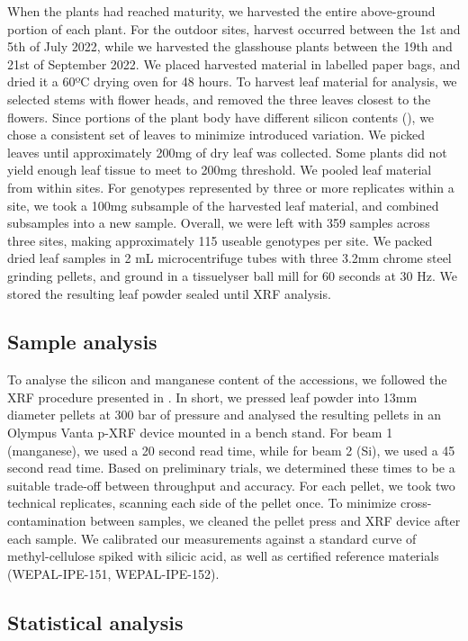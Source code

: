 \documentclass[12pt, letterpaper, ]{report}
\begin{document}
When the plants had reached maturity, we harvested the entire above-ground portion of each plant. For the outdoor sites, harvest occurred between the 1st and 5th of July 2022, while we harvested the glasshouse plants between the 19th and 21st of September 2022. We placed harvested material in labelled paper bags, and dried it a 60ºC drying oven for 48 hours. To harvest leaf material for analysis, we selected stems with flower heads, and removed the three leaves closest to the flowers. Since portions of the plant body have different silicon contents (\cite{dai_genetic_2005}), we chose a consistent set of leaves to minimize introduced variation. We picked leaves until approximately 200mg of dry leaf was collected. Some plants did not yield enough leaf tissue to meet to 200mg threshold. We pooled leaf material from within sites. For genotypes represented by three or more replicates within a site, we took a 100mg subsample of the harvested leaf material, and combined subsamples into a new sample. Overall, we were left with 359 samples across three sites, making approximately 115 useable genotypes per site. We packed dried leaf samples in 2 mL microcentrifuge tubes with three 3.2mm chrome steel grinding pellets, and ground in a tissuelyser ball mill for 60 seconds at 30 Hz. We stored the resulting leaf powder sealed until XRF analysis.  

\subsection{Sample analysis}

To analyse the silicon and manganese content of the accessions, we followed the XRF procedure presented in \textcite{reidinger_rapid_2012}. In short, we pressed leaf powder into 13mm diameter pellets at 300 bar of pressure and analysed the resulting pellets in an Olympus Vanta p-XRF device mounted in a bench stand. For beam 1 (manganese), we used a 20 second read time, while for beam 2 (Si), we used a 45 second read time. Based on preliminary trials, we determined these times to be a suitable trade-off between throughput and accuracy. For each pellet, we took two technical replicates, scanning each side of the pellet once. To minimize cross-contamination between samples, we cleaned the pellet press and XRF device after each sample. We calibrated our measurements against a standard curve of methyl-cellulose spiked with silicic acid, as well as certified reference materials (WEPAL-IPE-151, WEPAL-IPE-152).

\subsection{Statistical analysis}
\end{document}
